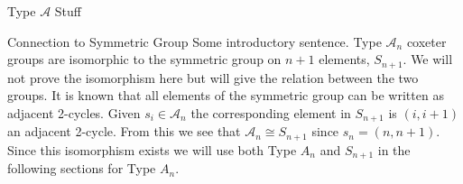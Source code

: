 \documentclass[11pt]{amsart}
\theoremstyle{definition}
\numberwithin{equation}{section}
\newcommand{\A}{\mathcal{A}}
\renewcommand{\(}{\left(}
\renewcommand{\)}{\right)}
\begin{document}
\begin{section}{Type $\A$ Stuff}

\begin{subsection}{Connection to Symmetric Group}
Some introductory sentence. Type $\A_n$ coxeter groups are isomorphic to the symmetric group on $n+1$ elements, $S_{n+1}$. We will not prove the isomorphism here but will give the relation between the two groups. It is known that all elements of the symmetric group can be written as adjacent 2-cycles. Given $s_i \in \A_n$ the corresponding element in $S_{n+1}$ is $(i, i+1)$ an adjacent 2-cycle. From this we see that $\A_n \cong S_{n+1}$ since $s_n=(n, n+1)$. Since this isomorphism exists we will use both Type $A_n$ and $S_{n+1}$ in the following sections for Type $A_n$. 
\end{subsection}


\end{section}
\end{document}
